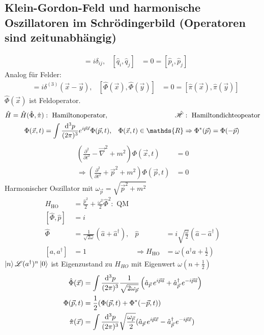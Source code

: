 \subsection{Klein-Gordon-Feld und harmonische Oszillatoren im Schrödingerbild (Operatoren sind zeitunabhängig)}
	\begin{align*}
		[\hat{q}_i, \hat{p}_j] &= i \delta_{ij},&
		[\hat{q}_i, \hat{q}_j] &= 0 = [\hat{p}_i, \hat{p}_j]
	\end{align*}
Analog für Felder:
	\begin{align*}
		[\hat{\Phi}(\vec{x}), \hat{\pi}(\vec{y})] &= 
		i \delta^{(3)}(\vec{x}- \vec{y}),&
		[\hat{\Phi}(\vec{x}), \hat{\Phi}(\vec{y})] &= 0 = 
		[\hat{\pi}(\vec{x}), \hat{\pi}(\vec{y})]
	\end{align*}
$\hat{\Phi}(\vec{x})$ ist Feldoperator.
	\begin{align*}
		\hat{H} = \hat{H} (\hat{\Phi}, \hat{\pi})&: 
		\text{ Hamiltonoperator},&
		\hat{\Ha}&: \text{ Hamiltondichteopeator} \\
		\Phi(\vec{x},t) &= \int \frac{\diff^3 p}{(2 \pi)^3} e^{i\vec{p}\vec{x}} \Phi(\vec{p},t),& 
		\Phi(\vec{x},t) \in \mathds{R}&\Rightarrow \Phi^* (\vec{p}) = \Phi (-\vec{p}) 
	\end{align*}
	\begin{align*}
		\left(
			\frac{\partial^2}{\partial t^2} - \vec{\nabla}^2 + m^2
		\right) \Phi(\vec{x}, t) &= 0 \\
		\Rightarrow \left(
			\frac{\partial^2}{\partial t^2} + \vec{p}^2 + m^2
		\right) \Phi(\vec{p}, t) &= 0
	\end{align*}
Harmonischer Oszillator mit $\omega_{\vec{p}} = \sqrt{\vec{p}^2 + m^2}$
	\begin{align*}
		H_{\text{HO}} &= \frac{\hat{p}^2}{2} + \frac{\omega^2}{2} \hat{\Phi}^2 : \text{ QM} \\
		[\hat{\Phi}, \hat{p}] &= i \\
		\hat{\Phi} &= \frac{1}{\sqrt{2 \omega}} (\hat{a} + \hat{a}^\dagger),&
		\hat{p} &= i \sqrt{\frac{\omega}{2}}( \hat{a} - \hat{a}^\dagger) \\
		[a, a^\dagger] &= 1 & \Rightarrow
		H_{\text{HO}} &= \omega(a^\dagger a + \frac{1}{2})
	\end{align*}
$\ket{n} \mathscr{L} (a^\dagger)^n \ket{0}$ ist Eigenzustand zu $H_{HO}$ mit Eigenwert $\omega (n + \frac{1}{2})$ 
	\begin{align*}
		\hat{\Phi} (\vec{x}) &= 
		\int \frac{\mathrm{d}^3 p}{(2 \pi)^3} \frac{1}{\sqrt{2 \omega_{\vec{p}}}}
		\left(	
			\hat{a}_{\vec{p}} \,e^{i\vec{p}\vec{a}} + \hat{a}^\dagger_{\vec{p}}\, e^{-i\vec{p}\vec{a}}
		\right) \\
		\Phi (\vec{p},t) &= \frac{1}{2} (\Phi(\vec{p},t) + \Phi^*(-\vec{p},t)) \\
		\hat{\pi}(\vec{x}) &= \int \frac{\mathrm{d}^3 p}{(2\pi)^3}
		\sqrt{\frac{\omega_{\vec{p}}}{2}} (\hat{a}_{\vec{p}} \,e^{i \vec{p} \vec{x}} -
		\hat{a}^\dagger_{\vec{p}} \,e^{- i \vec{p} \vec{x}}) 
	\end{align*}
